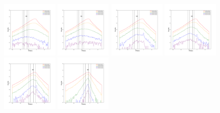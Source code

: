 \documentclass[12pt,prd]{article}
\begin{document}
\begin{figure}[h!]
\includegraphics[width=0.24\textwidth]{../figures/scanning_plotsgaiascan_l101_2_b58_4_ra212_7_dec55_2_npy_5.pdf}
\includegraphics[width=0.24\textwidth]{../figures/scanning_plotsgaiascan_l101_2_b58_4_ra212_7_dec55_2_npy_6.pdf}
\includegraphics[width=0.24\textwidth]{../figures/scanning_plotsgaiascan_l101_2_b58_4_ra212_7_dec55_2_npy_7.pdf}
\includegraphics[width=0.24\textwidth]{../figures/scanning_plotsgaiascan_l101_2_b58_4_ra212_7_dec55_2_npy_8.pdf}
\includegraphics[width=0.24\textwidth]{../figures/scanning_plotsgaiascan_l101_2_b58_4_ra212_7_dec55_2_npy_9.pdf}
\includegraphics[width=0.24\textwidth]{../figures/scanning_plotsgaiascan_l101_2_b58_4_ra212_7_dec55_2_npy_10.pdf}

\end{figure}
\end{document}
